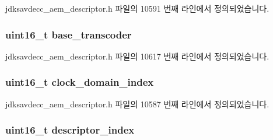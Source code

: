 jdksavdecc\+\_\+aem\+\_\+descriptor.\+h 파일의 10591 번째 라인에서 정의되었습니다.

\subsubsection[{\texorpdfstring{base\+\_\+transcoder}{base_transcoder}}]{\setlength{\rightskip}{0pt plus 5cm}uint16\+\_\+t base\+\_\+transcoder}\hypertarget{structjdksavdecc__descriptor__sensor__unit_ac7e02a98f43dc72d6384a6635fbaf944}{}\label{structjdksavdecc__descriptor__sensor__unit_ac7e02a98f43dc72d6384a6635fbaf944}


jdksavdecc\+\_\+aem\+\_\+descriptor.\+h 파일의 10617 번째 라인에서 정의되었습니다.

\subsubsection[{\texorpdfstring{clock\+\_\+domain\+\_\+index}{clock_domain_index}}]{\setlength{\rightskip}{0pt plus 5cm}uint16\+\_\+t clock\+\_\+domain\+\_\+index}\hypertarget{structjdksavdecc__descriptor__sensor__unit_a6608f023d147b556a49527d568abed8e}{}\label{structjdksavdecc__descriptor__sensor__unit_a6608f023d147b556a49527d568abed8e}


jdksavdecc\+\_\+aem\+\_\+descriptor.\+h 파일의 10587 번째 라인에서 정의되었습니다.

\subsubsection[{\texorpdfstring{descriptor\+\_\+index}{descriptor_index}}]{\setlength{\rightskip}{0pt plus 5cm}uint16\+\_\+t descriptor\+\_\+index}\hypertarget{structjdksavdecc__descriptor__sensor__unit_a042bbc76d835b82d27c1932431ee38d4}{}\label{structjdksavdecc__descriptor__sensor__unit_a042bbc76d835b82d27c1932431ee38d4}


